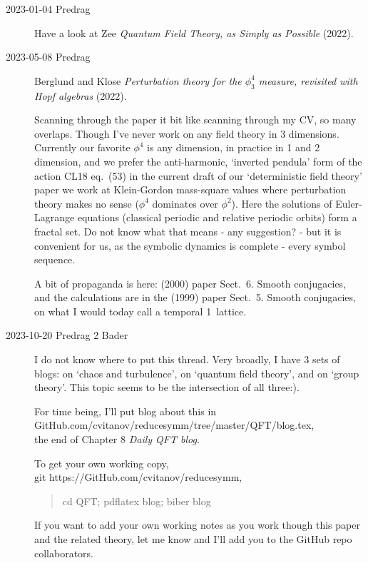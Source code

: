 \begin{description}
    \item[2023-01-04 Predrag]
Have a look at
Zee {\em Quantum Field Theory, as Simply as Possible} (2022).

\item[2023-05-08 Predrag]
Berglund and Klose
{\em Perturbation theory for the {$\phi^4_3$} measure,
revisited with {Hopf} algebras} (2022).

Scanning through the paper it bit like scanning through my CV, so many
overlaps. Though I've never work on any field theory in 3 dimensions.
Currently our favorite $\phi^4$ is any dimension, in practice in 1 and 2
dimension, and we prefer the anti-harmonic, `inverted pendula' form of
the action
{CL18 eq.~(53)}
in the current draft of our `deterministic field theory' paper
we work at Klein-Gordon mass-square values where perturbation theory makes
no sense ($\phi^4$ dominates over $\phi^2$). Here the solutions of
Euler-Lagrange equations (classical periodic and relative periodic
orbits) form a fractal set. Do not know what that means - any suggestion? - but it is
convenient for us, as the symbolic dynamics is complete - every symbol
sequence.

A bit of propaganda is here: (2000) paper
{Sect.~6. Smooth conjugacies},
and the calculations are in the (1999) paper
{Sect.~5. Smooth conjugacies}, on what I would today call a temporal 1\dmn\
lattice.


\item[2023-10-20 Predrag 2 Bader]
I do not know where to put this thread. Very broadly, I have 3
sets of blogs:
on `chaos and turbulence',
on `quantum field theory', and
on `group theory'.
This topic seems to be the intersection of all three:).

For time being, I'll put blog about this in
\\
{GitHub.com/cvitanov/reducesymm/tree/master/QFT/blog.tex},
\\
the end of Chapter 8 {\em Daily QFT blog}.

To get your own working copy,
\\
git 
{https://GitHub.com/cvitanov/reducesymm},
\begin{quote}
cd QFT; pdflatex blog; biber blog
\end{quote}
If you want to add your own working
notes as you work though this paper and the related theory, let me know
and I'll add you to the GitHub repo collaborators.


\end{description}
